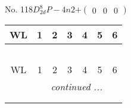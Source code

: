 \documentclass[fleqn,9pt,landscape]{jsarticle}
\begin{document}
\newpage
No. 118\quad$D_{2d}^{8}$\quad$P-4n2$\quad[ tetragonal ]\quad$+\begin{pmatrix} 0 & 0 & 0 \end{pmatrix}$
\begin{center}
\renewcommand{\arraystretch}{1.2}
\begin{longtable}{ccccccc}
 \hline \hline
WL & 1 & 2 & 3 & 4 & 5 & 6 \\ \hline \endfirsthead

\multicolumn{6}{l}{\tablename\ \thetable{}} \\
 \hline \hline
WL & 1 & 2 & 3 & 4 & 5 & 6 \\ \hline \endhead

 \hline \hline
\multicolumn{6}{r}{\footnotesize\it continued ...} \\ \endfoot

 \hline \hline
\multicolumn{6}{r}{} \\ \endlastfoot


\end{longtable}
\end{center}
\end{document}
